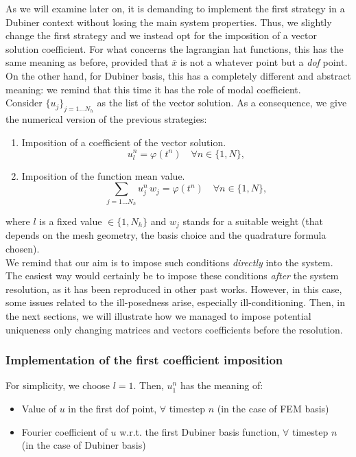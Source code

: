 \documentclass[a4paper,11pt]{article}
\begin{document}
\noindent As we will examine later on, it is demanding to implement the first strategy in a Dubiner context without losing the main system properties. Thus, we slightly change the first strategy and we instead opt for the imposition of a vector solution coefficient. For what concerns the lagrangian hat functions, this has the same meaning as before, provided that $\bar{x}$ is not a whatever point but a \emph{dof} point. On the other hand, for Dubiner basis, this has a completely different and abstract meaning: we remind that this time it has the role of modal coefficient. \\

\noindent Consider $\{u_j\}_{j=1 \dots N_h}$ as the list of the vector solution. As a consequence, we give the numerical version of the previous strategies:
\begin{enumerate}
	\item Imposition of a coefficient of the vector solution.
	\begin{equation*}
	u_l^n = \varphi(t^n) \quad \forall n \in \{1,N\},
	\end{equation*}
	\item Imposition of the function mean value.
	\begin{equation*}
	\sum_{j=1\dots N_h} u_j^n \, w_j = \varphi(t^n)\quad \forall n \in \{1,N\},
	\end{equation*}
\end{enumerate}	
where $l$ is a fixed value $\in \{1,N_h\}$ and $w_j$ stands for a suitable weight (that depends on the mesh geometry, the basis choice and the quadrature formula chosen). \\

\noindent We remind that our aim is to impose such conditions \emph{directly} into the system. The easiest way would certainly be to impose these conditions \emph{after} the system resolution, as it has been reproduced in other past works. However, in this case, some issues related to the ill-posedness arise, especially ill-conditioning. Then, in the next sections, we will illustrate how we managed to impose potential uniqueness only changing matrices and vectors coefficients before the resolution.

\subsubsection{Implementation of the first coefficient imposition} \label{first_coeff_implementation}
For simplicity, we choose $l=1$. Then, $u_1^n$ has the meaning of:
\begin{itemize}
	\item Value of $u$ in the first dof point, $\forall$ timestep $n$ (in the case of FEM basis)
	\item Fourier coefficient of $u$ w.r.t. the first Dubiner basis function, $\forall$ timestep $n$ (in the case of Dubiner basis)
\end{itemize}
\end{document}
